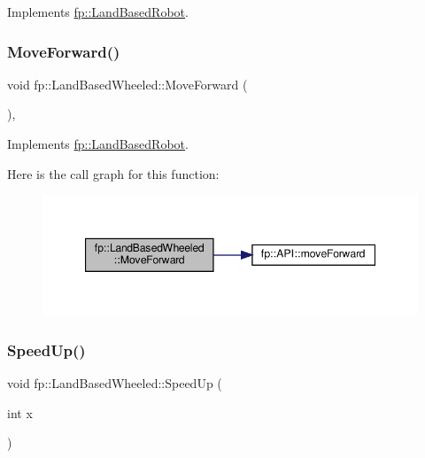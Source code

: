Implements \hyperlink{classfp_1_1_land_based_robot_a50841b6e40d4e92832770d26b427fea2}{fp\+::\+Land\+Based\+Robot}.

\mbox{\label{classfp_1_1_land_based_wheeled_af7875b805655b6f654e49a885f31122a}} 
\subsubsection{\texorpdfstring{Move\+Forward()}{MoveForward()}}
{\footnotesize\ttfamily void fp\+::\+Land\+Based\+Wheeled\+::\+Move\+Forward (\begin{DoxyParamCaption}{ }\end{DoxyParamCaption})\hspace{0.3cm}{\ttfamily [override]}, {\ttfamily [virtual]}}



Implements \hyperlink{classfp_1_1_land_based_robot_a5df828c5d6c1f7fb4c7b68f53d9c6080}{fp\+::\+Land\+Based\+Robot}.

Here is the call graph for this function\+:
\nopagebreak
\begin{figure}[H]
\begin{center}
\leavevmode
\includegraphics[width=347pt]{classfp_1_1_land_based_wheeled_af7875b805655b6f654e49a885f31122a_cgraph}
\end{center}
\end{figure}
\mbox{\label{classfp_1_1_land_based_wheeled_a8fc1115e4c49fec71b38a520df4d1528}} 
\subsubsection{\texorpdfstring{Speed\+Up()}{SpeedUp()}}
{\footnotesize\ttfamily void fp\+::\+Land\+Based\+Wheeled\+::\+Speed\+Up (\begin{DoxyParamCaption}\item[{int}]{x }\end{DoxyParamCaption})}



